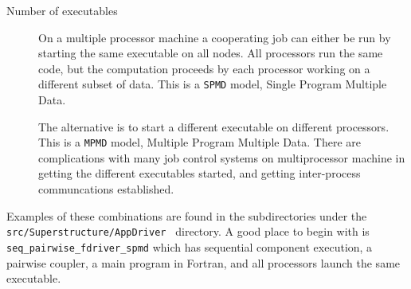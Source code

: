 \begin{description}
\item[Number of executables]

On a multiple processor machine a cooperating job can either be run
by starting the same executable on all nodes.  All processors run the
same code, but the computation proceeds by each processor working on
a different subset of data.  This is a {\tt SPMD} model, Single Program
Multiple Data.  

The alternative is to start a different executable on different
processors.  This is a {\tt MPMD} model, Multiple Program Multiple Data.
There are complications with many job control systems on multiprocessor
machine in getting the different executables started, and getting
inter-process communcations established.

\end{description}


Examples of these combinations are found in the
subdirectories under the {\tt src/Superstructure/AppDriver } directory.
A good place to begin with is
{\tt seq\_pairwise\_fdriver\_spmd} which
has sequential component execution, a pairwise coupler, a main program
in Fortran, and all processors launch the same executable.

